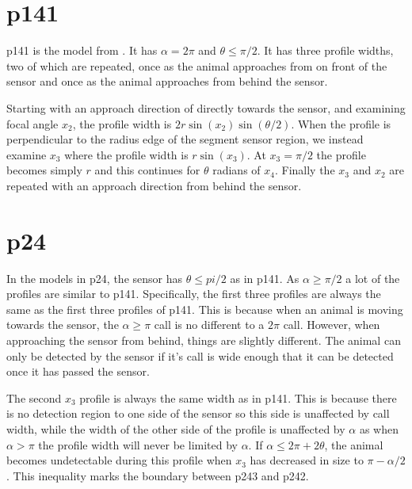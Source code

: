 

\section{p141} \label{p141}

p141 is the model from \citep{rowcliffe2008estimating}. It has $\alpha =2\pi$ and $\theta \le \pi/2$. It has three profile widths, two of which are repeated, once as the animal approaches from on front of the sensor and once as the animal approaches from behind the sensor.

Starting with an approach direction of directly towards the sensor, and examining focal angle $x_2$, the profile width is $2r\sin(x_2)\sin(\theta/2)$. When the profile is perpendicular to the radius edge of the segment sensor region, we instead examine $x_3$ where the profile width is $r\sin(x_3)$. At $x_3=\pi/2$ the profile becomes simply $r$ and this continues for $\theta $ radians of $x_4$. Finally the $x_3$ and $x_2$ are repeated with an approach direction from behind the sensor. 



\section{p24} \label{p24}

In the models in p24, the sensor has $\theta \le pi/2$ as in p141. As $\alpha \ge \pi/2$ a lot of the profiles are similar to p141. Specifically, the first three profiles are always the same as the first three profiles of p141. This is because when an animal is moving towards the sensor, the $\alpha \ge \pi$ call is no different to a $2\pi$ call. However, when approaching the sensor from behind, things are slightly different. The animal can only be detected by the sensor if it's call is wide enough that it can be detected once it has passed the sensor. 

The second $x_3$ profile is always the same width as in p141. This is because there is no detection region to one side of the sensor so this side is unaffected by call width, while the width of the other side of the profile is unaffected by $\alpha$ as when $\alpha>\pi$ the profile width will never be limited by $\alpha$. If $\alpha \le 2\pi + 2\theta$, the animal becomes undetectable during this profile when  $x_3$ has decreased in size to $\pi - \alpha/2$. This inequality marks the boundary between p243 and p242. 

